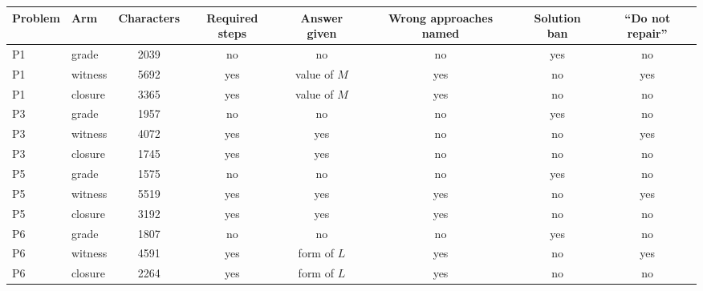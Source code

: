 \begingroup\scriptsize\setlength{\tabcolsep}{4pt}
\begin{tabular}{@{}llcccccc@{}}
\toprule
Problem & Arm & Characters & Required steps & Answer given & Wrong approaches named & Solution ban & ``Do not repair'' \\
\midrule
P1 & grade & 2039 & no & no & no & yes & no \\
P1 & witness & 5692 & yes & value of $M$ & yes & no & yes \\
P1 & closure & 3365 & yes & value of $M$ & yes & no & no \\
\midrule
P3 & grade & 1957 & no & no & no & yes & no \\
P3 & witness & 4072 & yes & yes & no & no & yes \\
P3 & closure & 1745 & yes & yes & no & no & no \\
\midrule
P5 & grade & 1575 & no & no & no & yes & no \\
P5 & witness & 5519 & yes & yes & yes & no & yes \\
P5 & closure & 3192 & yes & yes & yes & no & no \\
\midrule
P6 & grade & 1807 & no & no & no & yes & no \\
P6 & witness & 4591 & yes & form of $L$ & yes & no & yes \\
P6 & closure & 2264 & yes & form of $L$ & yes & no & no \\
\bottomrule
\end{tabular}
\endgroup
